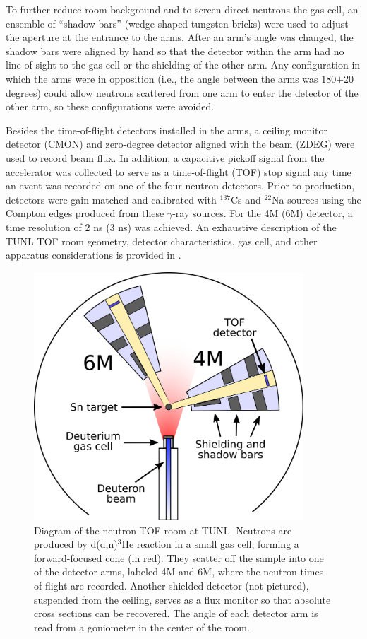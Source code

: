 To further reduce room background and to screen direct neutrons the gas cell,
an ensemble of ``shadow bars'' (wedge-shaped tungsten bricks)
were used to adjust the aperture at the entrance to the arms. After an arm's
angle was changed, the shadow bars were aligned by hand so that the
detector within the arm had no line-of-sight to the gas cell or the
shielding of the other arm. Any configuration in which the arms were in opposition (i.e., the
angle between the arms was 180$\pm$20 degrees) could allow neutrons scattered
from one arm to enter the detector of the other arm, so these configurations were avoided.

Besides the time-of-flight detectors installed in the arms, a ceiling monitor
detector (CMON) and zero-degree detector aligned with the beam (ZDEG) were used
to record beam flux. In addition, a capacitive pickoff signal
from the accelerator was collected to serve as a time-of-flight
(TOF) stop signal any time an event was recorded on one of the four neutron
detectors. Prior to production, detectors were gain-matched and calibrated with $^{137}$Cs
and $^{22}$Na sources using the Compton edges produced from these $\gamma$-ray sources. For the
4M (6M) detector, a time resolution of 2 ns (3 ns) was achieved.
An exhaustive description of the TUNL TOF room geometry, detector characteristics,
gas cell, and other apparatus considerations is provided in \cite{GussPhDThesis}.
\begin{figure}[h]
    \centering
    \includegraphics[width = 0.9\textwidth]{figures/ExperimentalSetupTUNL.png}
    \caption[Diagram of the neutron TOF room at TUNL] 
    {
        Diagram of the neutron TOF room at TUNL. Neutrons are produced by d(d,n)$^{3}$He reaction in
        a small gas cell, forming a forward-focused cone (in red). They scatter
        off the sample into one of the detector arms, labeled 4M and 6M, where the neutron
        times-of-flight are recorded. Another shielded detector (not pictured), suspended from the 
        ceiling, serves as a flux monitor so that absolute cross sections can be
        recovered. The angle of each detector arm is read from a goniometer in
        the center of the room.
    }
    \label{ExperimentalSetupTUNL}
\end{figure}

